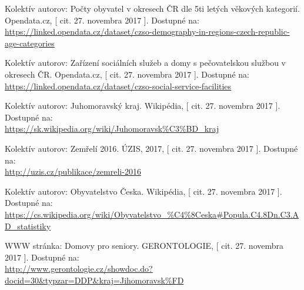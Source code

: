 \documentclass[a4paper, 11pt]{article}
\begin{document}
\renewcommand\refname{Odkazy}
\begin{thebibliography}{9}
 Kolektív autorov: Počty obyvatel v okresech ČR dle 5ti letých věkových kategorií. Opendata.cz, [ cit. 27. novembra 2017 ]. Dostupné na: \\\url{https://linked.opendata.cz/dataset/czso-demography-in-regions-czech-republic-age-categories}

 Kolektív autorov: Zařízení sociálních služeb a domy s pečovatelskou službou v okresech ČR. Opendata.cz, [ cit. 27. novembra 2017 ]. Dostupné na: \\\url{https://linked.opendata.cz/dataset/czso-social-service-facilities}

 Kolektív autorov: Juhomoravský kraj. Wikipédia, [ cit. 27. novembra 2017 ]. Dostupné na: \\\url{https://sk.wikipedia.org/wiki/Juhomoravsk%C3%BD_kraj}

 Kolektív autorov: Zemřelí 2016. ÚZIS, 2017, [ cit. 27. novembra 2017 ]. Dostupné na:
\\\url{http://uzis.cz/publikace/zemreli-2016}

 Kolektív autorov: Obyvatelstvo Česka. Wikipédia, [ cit. 27. novembra 2017 ]. Dostupné na:\\\url{https://cs.wikipedia.org/wiki/Obyvatelstvo_%C4%8Ceska#Popula.C4.8Dn.C3.AD_statistiky}

 WWW stránka: Domovy pro seniory. GERONTOLOGIE, [ cit. 27. novembra 2017 ]. Dostupné na: 
\\\url{http://www.gerontologie.cz/showdoc.do?docid=30&typzar=DDP&kraj=Jihomoravsk%FD}

\end{thebibliography}
\end{document}
